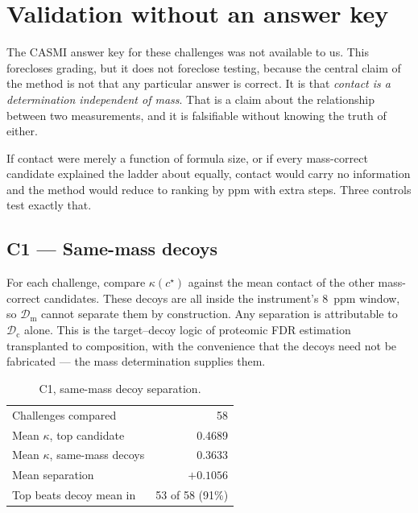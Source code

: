 \documentclass[11pt,twocolumn,a4paper]{article}
\theoremstyle{definition}
\theoremstyle{remark}
\newcommand{\Dmass}{\mathcal{D}_{\mathrm{m}}}
\newcommand{\Dcon}{\mathcal{D}_{\mathrm{c}}}
\newcommand{\con}{\kappa}
\begin{document}
\section{Validation without an answer key}
\label{sec:validation}

The CASMI answer key for these challenges was not available to us. This forecloses
grading, but it does not foreclose testing, because the central claim of the
method is not that any particular answer is correct. It is that
\emph{contact is a determination independent of mass}. That is a claim about the
relationship between two measurements, and it is falsifiable without knowing the
truth of either.

If contact were merely a function of formula size, or if every mass-correct
candidate explained the ladder about equally, contact would carry no information
and the method would reduce to ranking by ppm with extra steps. Three controls
test exactly that.

\subsection{C1 --- Same-mass decoys}

For each challenge, compare $\con(c^\star)$ against the mean contact of the other
mass-correct candidates. These decoys are all inside the instrument's 8~ppm
window, so $\Dmass$ cannot separate them by construction. Any separation is
attributable to $\Dcon$ alone. This is the target--decoy logic of proteomic FDR
estimation~\citep{elias2007target,kall2008assigning} transplanted to composition,
with the convenience that the decoys need not be fabricated --- the mass
determination supplies them.

\begin{table}[!htbp]
\centering
\caption{C1, same-mass decoy separation.}
\label{tab:c1}
\begin{tabular}{lr}
\toprule
Challenges compared               & 58 \\
Mean $\con$, top candidate        & 0.4689 \\
Mean $\con$, same-mass decoys     & 0.3633 \\
Mean separation                   & $+0.1056$ \\
Top beats decoy mean in           & 53 of 58 (91\%) \\
\bottomrule
\end{tabular}
\end{table}
\end{document}
